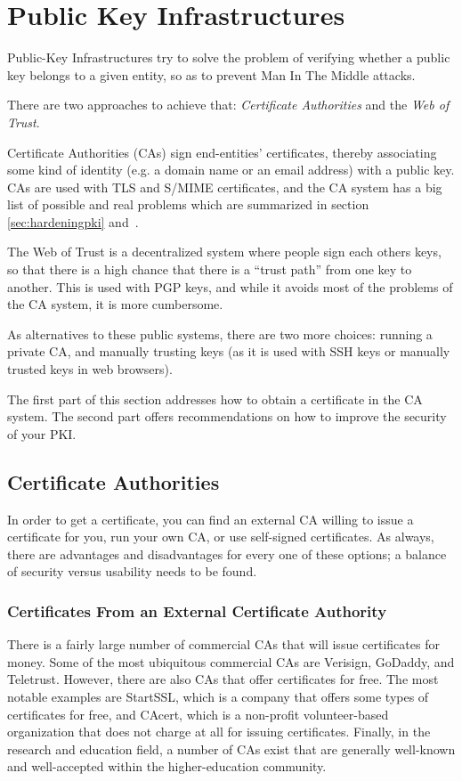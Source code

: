 \section{Public Key Infrastructures}
\label{section:PKIs}

Public-Key Infrastructures try to solve the problem of verifying
whether a public key belongs to a given entity, so as to prevent Man
In The Middle attacks.

There are two approaches to achieve that: \emph{Certificate Authorities}
and the \emph{Web of Trust}.

Certificate Authorities (CAs) sign end-entities' certificates, thereby
associating some kind of identity (e.g. a domain name or an email
address) with a public key. CAs are used with TLS and S/MIME
certificates, and the CA system has a big list of possible and real
problems which are summarized in section \ref{sec:hardeningpki} and~\cite{https13}.

The Web of Trust is a decentralized system where people sign each
others keys, so that there is a high chance that there is a ``trust
path'' from one key to another. This is used with PGP keys, and while
it avoids most of the problems of the CA system, it is more
cumbersome.

As alternatives to these public systems, there are two more choices:
running a private CA, and manually trusting keys (as it is used with
SSH keys or manually trusted keys in web browsers).

The first part of this section addresses how to obtain a certificate
in the CA system. The second part offers recommendations on how to
improve the security of your PKI.

\subsection{Certificate Authorities}
\label{sec:cas}
In order to get a certificate, you can find an external CA willing to issue
a certificate for you, run your own CA, or use self-signed certificates.
As always, there are advantages and disadvantages for every one of these
options; a balance of security versus usability needs to be found.

\subsubsection{Certificates From an External Certificate Authority}
\label{sec:signcertfromca}

There is a fairly large number of commercial CAs that will issue
certificates for money.  Some of the most ubiquitous commercial CAs are
Verisign, GoDaddy, and Teletrust.  However, there are also CAs that offer
certificates for free.  The most notable examples are StartSSL, which is a
company that offers some types of certificates for free, and CAcert, which
is a non-profit volunteer-based organization that does not charge at all
for issuing certificates.  Finally, in the research and education field, a
number of CAs exist that are generally well-known and well-accepted within
the higher-education community.

